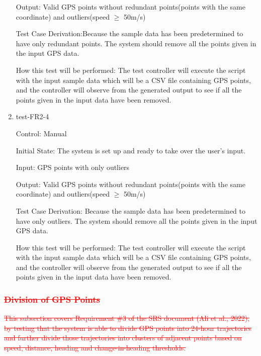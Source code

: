 \documentclass[12pt, titlepage]{article}
\begin{document}
\begin{enumerate}
Output: Valid GPS points without redundant points(points with the same coordinate) and outliers(speed $\geq$ 50m/s)

Test Case Derivation:Because the sample data has been predetermined to have only redundant points. The system should remove all the points given in the input GPS data.

How this test will be performed: The test controller will execute the script with the input sample data which will be a CSV file containing GPS points, and the controller will observe from the generated output to see if all the points given in the input data have been removed.

\item{test-FR2-4} \label{test-FR2-4}

Control: Manual
					
Initial State: The system is set up and ready to take over the user's input.
					
Input: GPS points with only outliers
					
Output: Valid GPS points without redundant points(points with the same coordinate) and outliers(speed $\geq$ 50m/s)

Test Case Derivation: Because the sample data has been predetermined to have only outliers. The system should remove all the points given in the input GPS data.

How this test will be performed: The test controller will execute the script with the input sample data which will be a CSV file containing GPS points, and the controller will observe from the generated output to see if all the points given in the input data have been removed.

\end{enumerate}

\subsubsection{\textcolor{red}{\sout{Division of GPS Points}}}

\textcolor{red}{\sout{This subsection covers Requirement \#3 of the SRS document (Ali et al., 2022), by testing that the system is able to divide GPS points into 24-hour trajectories and further divide those trajectories into clusters of adjacent points based on speed, distance, heading and change-in-heading thresholds.}}
\end{document}
